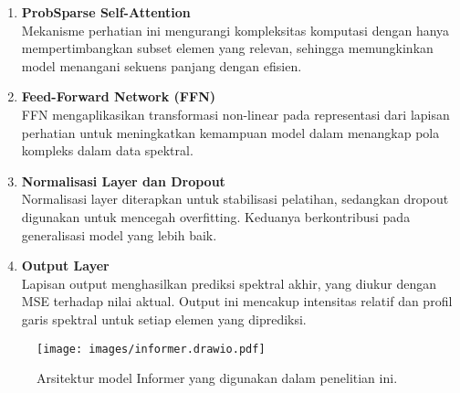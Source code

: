 \begin{enumerate}
\begin{enumerate}
      \item \textbf{ProbSparse Self-Attention} \\
      Mekanisme perhatian ini mengurangi kompleksitas komputasi dengan hanya mempertimbangkan subset elemen yang relevan, sehingga memungkinkan model menangani sekuens panjang dengan efisien.

      \item \textbf{Feed-Forward Network (FFN)} \\
      FFN mengaplikasikan transformasi non-linear pada representasi dari lapisan perhatian untuk meningkatkan kemampuan model dalam menangkap pola kompleks dalam data spektral.

      \item \textbf{Normalisasi Layer dan Dropout} \\
      Normalisasi layer diterapkan untuk stabilisasi pelatihan, sedangkan dropout digunakan untuk mencegah overfitting. Keduanya berkontribusi pada generalisasi model yang lebih baik.

      \item \textbf{Output Layer} \\
      Lapisan output menghasilkan prediksi spektral akhir, yang diukur dengan MSE terhadap nilai aktual. Output ini mencakup intensitas relatif dan profil garis spektral untuk setiap elemen yang diprediksi.
    \end{enumerate}   
    \begin{figure}
        \centering
        \texttt{[image: images/informer.drawio.pdf]}
        \caption{Arsitektur model Informer yang digunakan dalam penelitian ini.}
        \label{fig:informer_architecture}
    \end{figure}
\end{enumerate}





